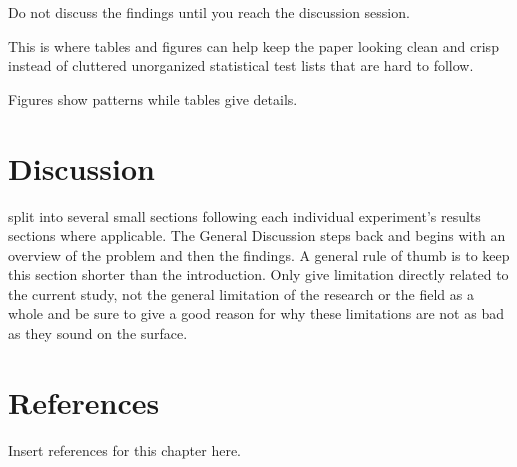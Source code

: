 Do not discuss the findings until you reach the discussion session. 

This is where tables and figures can help keep the paper looking clean and crisp instead of cluttered unorganized statistical test lists that are hard to follow. 

Figures show patterns while tables give details.



\section{Discussion}

split into several small sections following each individual experiment’s results sections where applicable. 
The General Discussion steps back and begins with an overview of the problem and then the findings. A general rule of thumb is to keep this section shorter than the introduction. Only give limitation directly related to the current study, not the general limitation of the research or the field as a whole and be sure to give a good reason for why these limitations are not as bad as they sound on the surface.



\section{References}

Insert references for this chapter here.









